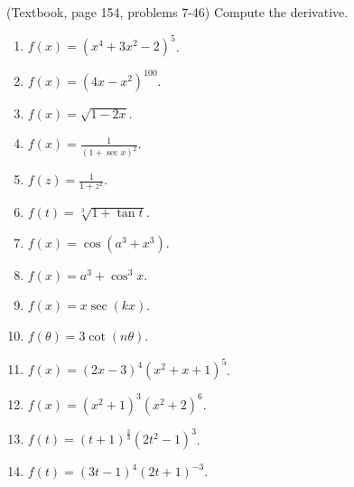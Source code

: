 (Textbook, page 154, problems 7-46) Compute the derivative.
\begin{multicols}{2}
\begin{enumerate}
\item $\displaystyle f(x)= (x^4+3x^2-2)^5$.

\item $\displaystyle f(x)= (4x-x^2)^{100}$.

\item $\displaystyle f(x)= \sqrt{1-2x}$.

\item $\displaystyle f(x)= \frac{1}{(1+\sec x)^2}$.

\item $\displaystyle f(z)=\frac{1}{1+z^2} $.

\item $\displaystyle f(t)= \sqrt[3]{1+\tan t}$.

\item $\displaystyle f(x)=\cos (a^3+x^3) $.

\item $\displaystyle f(x)= a^3+\cos^3 x$.

\item $\displaystyle f(x)= x\sec (k x) $.

\item $\displaystyle f(\theta)= 3\cot (n\theta)$.

\item $\displaystyle f(x)= (2x - 3)^4 (x^2 + x + 1)^5$.

\item $\displaystyle f(x)= (x^2+1)^3(x^2+2)^6$.

\item $\displaystyle f(t)= (t+1)^{\frac{2}{3}}(2t^2-1)^3$.

\item $\displaystyle f(t)= (3t-1)^4(2t+1)^{-3}$.


\end{enumerate}
\end{multicols}
